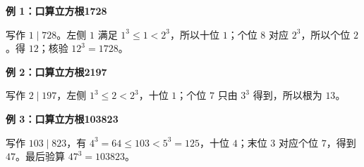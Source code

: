 \clearpage
\begin{examplebox}
\textbf{\textcolor{CExample}{例 1：口算立方根1728}}
\par\medskip
\begin{center}

\end{center}
\medskip
写作 $1\mid728$。左侧 $1$ 满足 $1^3\le1<2^3$，所以十位 $1$；个位 $8$ 对应 $2^3$，所以个位 $2$。得 $\boxed{12}$；核验 $12^3=1728$。
\end{examplebox}
\clearpage
\begin{examplebox}
\textbf{\textcolor{CExample}{例 2：口算立方根2197}}
\par\medskip
\begin{center}

\end{center}
\medskip
写作 $2\mid197$，左侧 $1^3\le2<2^3$，十位 $1$；个位 $7$ 只由 $3^3$ 得到，所以根为 $\boxed{13}$。
\end{examplebox}
\clearpage
\begin{examplebox}
\textbf{\textcolor{CExample}{例 3：口算立方根103823}}
\par\medskip
\begin{center}

\end{center}
\medskip
写作 $103\mid823$，有 $4^3=64\le103<5^3=125$，十位 $4$；末位 $3$ 对应个位 $7$，得到 $\boxed{47}$。最后验算 $47^3=103823$。
\end{examplebox}
